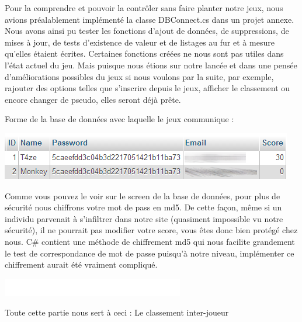 \documentclass [11pt]{report}
\begin{document}
	Pour la comprendre et pouvoir la contrôler sans faire planter notre jeux, nous avions préalablement implémenté la classe DBConnect.cs dans un projet annexe. Nous avons ainsi pu tester les fonctions d'ajout de données, de suppressions, de mises à jour, de tests d'existence de valeur et de listages au fur et à mesure qu'elles étaient écrites. Certaines fonctions créées ne nous sont pas utiles dans l'état actuel du jeu. Mais puisque nous étions sur notre lancée et dans une pensée d'améliorations possibles du jeux si nous voulons par la suite, par exemple, rajouter des options telles que s'inscrire depuis le jeux, afficher le classement ou encore changer de pseudo, elles seront déjà prête.\\
	
	\vspace{4mm}
	
	\noindent Forme de la base de données avec laquelle le jeux communique :
	\begin{center}
		\includegraphics[scale = 0.8]{images/Bdd.png}
	\end{center}
		
		
	\vspace{10mm}
	
	Comme vous pouvez le voir sur le screen de la base de données, pour plus de sécurité nous chiffrons votre mot de pass en md5. De cette façon, même si un individu parvenait à s'infiltrer dans notre site (quasiment impossible vu notre sécurité), il ne pourrait pas modifier votre score, vous êtes donc bien protégé chez nous. C\# contient une méthode de chiffrement md5 qui nous facilite grandement le test de correspondance de mot de passe puisqu'à notre niveau, implémenter ce chiffrement aurait été vraiment compliqué.
	
		
	\newpage
	
	\begin{center}
			\includegraphics[scale = 0.3]{images/blanc.png}
		\end{center}
	
	\noindent Toute cette partie nous sert à ceci : Le classement inter-joueur
	
\end{document}
